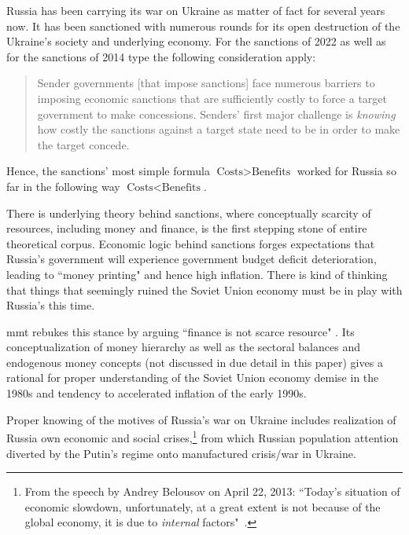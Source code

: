 Russia has been carrying its war on Ukraine as matter of fact for
several years now. It has been sanctioned with numerous rounds for its
open destruction of the Ukraine's society and underlying economy. For
the sanctions of 2022 as well as for the sanctions of 2014 type the
following consideration apply:

\begin{quote}
Sender governments [that impose sanctions] face numerous barriers to
imposing economic sanctions that are sufficiently costly to force a
target government to make concessions. Senders' first major challenge
is \textit{knowing} how costly the sanctions against a target state need to
be in order to make the target concede.~\citep[p.~169, emphasis added]{sanctions2021}
\end{quote}

Hence, the sanctions' most simple formula $\text{Costs}>\text{Benefits}$ worked for
Russia so far in the following way $\text{Costs}<\text{Benefits}$.

There is underlying theory behind sanctions, where conceptually scarcity
of resources, including money and finance, is the first stepping stone
of entire theoretical corpus. Economic logic behind sanctions forges
expectations that Russia's government will experience government budget
deficit deterioration, leading to ``money printing" and hence high
inflation. There is kind of thinking that things that seemingly ruined
the Soviet Union economy must be in play with Russia's this time.

\ac{mmt} rebukes this stance by arguing ``finance is not scarce resource"
\citep[p.~139]{wray2020}. Its conceptualization of money hierarchy as well as
the sectoral balances and endogenous money concepts (not discussed in
due detail in this paper) gives a rational for proper understanding of
the Soviet Union economy demise in the 1980s and tendency to accelerated
inflation of the early 1990s.

Proper knowing of the motives of Russia's war on Ukraine includes
realization of Russia own economic and social crises,\footnote{From the speech by Andrey Belousov on April 22, 2013: ``Today's situation of economic slowdown, unfortunately, at a great extent is not because of the global economy, it is due to \textit{internal} factors"~\citep[emphasis added]{kremlin2013}.} from which Russian population attention diverted by the Putin's regime onto manufactured crisis/war in Ukraine.
